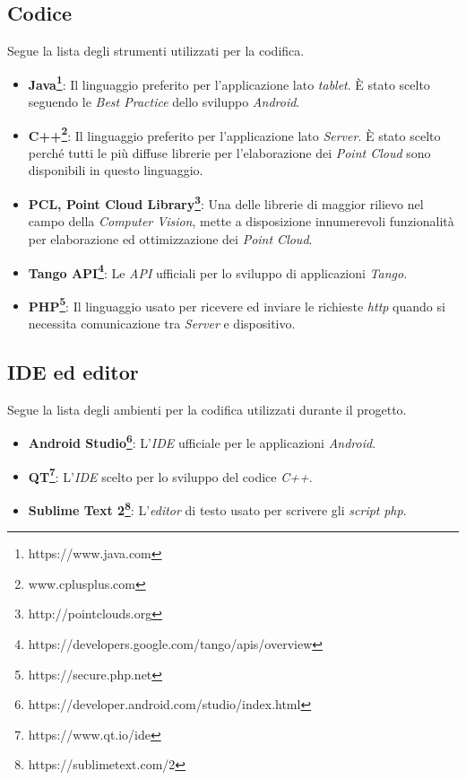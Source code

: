 \subsection{Codice}
Segue la lista degli strumenti utilizzati per la codifica.
\begin{itemize}
	\item \textbf{Java\footnote{https://www.java.com}}: Il linguaggio preferito per l'applicazione lato \emph{tablet}. È stato scelto seguendo le \emph{Best Practice} dello sviluppo \emph{Android}.
	\item \textbf{C++\footnote{www.cplusplus.com}}: Il linguaggio preferito per l'applicazione lato \emph{Server}. È stato scelto perché tutti le più diffuse librerie per l'elaborazione dei \emph{Point Cloud} sono disponibili in questo linguaggio.
	\item \textbf{PCL, Point Cloud Library\footnote{http://pointclouds.org}}: Una delle librerie di maggior rilievo nel campo della \emph{Computer Vision}, mette a disposizione innumerevoli funzionalità per elaborazione ed ottimizzazione dei \emph{Point Cloud}.
	\item \textbf{Tango API\footnote{https://developers.google.com/tango/apis/overview}}: Le \emph{API} ufficiali per lo sviluppo di applicazioni \emph{Tango}.
	\item \textbf{PHP\footnote{https://secure.php.net}}: Il linguaggio usato per ricevere ed inviare le richieste \emph{http} quando si necessita comunicazione tra \emph{Server} e dispositivo.
\end{itemize}

\subsection{IDE ed editor}
Segue la lista degli ambienti per la codifica utilizzati durante il progetto.
\begin{itemize}
	\item \textbf{Android Studio\footnote{https://developer.android.com/studio/index.html}}: L'\emph{IDE} ufficiale per le applicazioni \emph{Android}.
	\item \textbf{QT\footnote{https://www.qt.io/ide}}: L'\emph{IDE} scelto per lo sviluppo del codice \emph{C++}.
	\item \textbf{Sublime Text 2\footnote{https://sublimetext.com/2}}: L'\emph{editor} di testo usato per scrivere gli \emph{script} \emph{php}.
\end{itemize}

